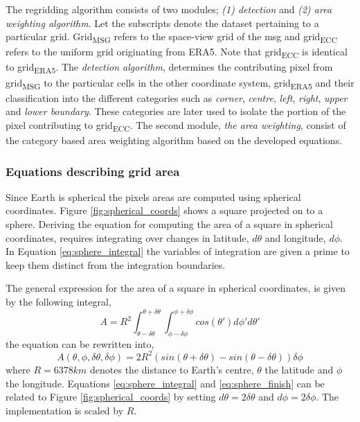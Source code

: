The regridding algorithm consists of two modules; \textit{(1) detection} and \textit{(2) area weighting algorithm}. Let the subscripts denote the dataset pertaining to a particular grid. Grid\textsubscript{MSG} refers to the space-view grid of the \acrlong{msg} and grid\textsubscript{ECC} refers to the uniform grid originating from ERA5. Note that grid\textsubscript{ECC} is identical to  grid\textsubscript{ERA5}. The \textit{detection algorithm}, determines the contributing pixel from grid\textsubscript{MSG} 
to the particular cells in the other coordinate system,
grid\textsubscript{ERA5} 
and their classification into the different categories such as \textit{corner}, \textit{centre}, \textit{left}, \textit{right}, \textit{upper} and \textit{lower boundary}. These categories are later used to isolate the portion of the pixel contributing to grid\textsubscript{ECC}.
The second module, \textit{the area weighting}, consist of the category based area weighting algorithm based on the developed equations.

\subsubsection{Equations describing grid area}
Since Earth is spherical the pixels areas are computed using spherical coordinates. Figure \ref{fig:spherical_coords} shows a square projected on to a sphere. Deriving the equation for computing the area of a square in spherical coordinates, requires integrating over changes in latitude, $d\theta$ and longitude, $d\phi$. In Equation \eqref{eq:sphere_integral} the variables of integration are given a prime to keep them distinct from the integration boundaries.

The general expression for the area of a square in spherical coordinates, is given by the following integral,
\begin{equation} \label{eq:sphere_integral}
    A = R^2\int_{ \theta - \delta \theta }^{\theta + \delta \theta} \int_{ \phi - \delta \phi }^{\phi + \delta \phi} cos\left( \theta' \right) d\phi' d\theta'
\end{equation}
the equation can be rewritten into,
\begin{equation} \label{eq:sphere_finish}
    A \left( \theta, \phi, \delta \theta, \delta \phi   \right)= 2R^2 \left( sin\left( \theta + \delta \theta  \right) - sin\left(  \theta - \delta \theta  \right) \right) \delta \phi
\end{equation}
where $R=6378km$ denotes the distance to Earth's centre, $\theta$ the latitude and $\phi$ the longitude. Equations \eqref{eq:sphere_integral} and \eqref{eq:sphere_finish} can be related to Figure \ref{fig:spherical_coords} by setting $d \theta = 2 \delta \theta$ and $d \phi = 2 \delta \phi$. The implementation is scaled by $R$.


